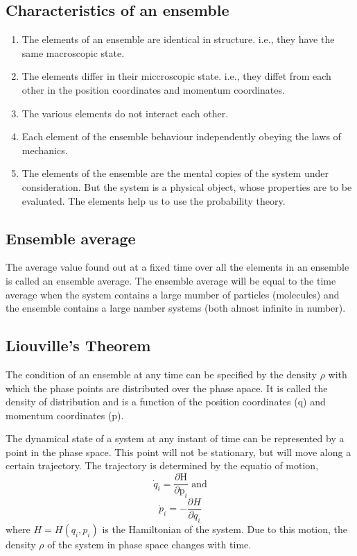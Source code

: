 \subsection{Characteristics of an ensemble}
\begin{enumerate}
	\item  The elements of an ensemble are identical in structure. i.e., they have the same macroscopic state.
\item  The elements differ in their miccroscopic state. i.e., they diffet from each other in the position coordinates and momentum coordinates.
\item  The various elements do not interact each other.
\item  Each element of the ensemble behaviour independently obeying the laws of mechanics.
\item  The elements of the ensemble are the mental copies of the system under consideration. But the system is a physical object, whose properties are to be evaluated. The elements help us to use the probability theory.
\end{enumerate}
\subsection{Ensemble average}
The average value found out at a fixed time over all the elements in an ensemble is called an ensemble average. The ensemble average will be equal to the time average when the system contains a large mumber of particles (molecules) and the ensemble contains a large namber systems (both almost infinite in number).
\subsection{Liouville's Theorem}
The condition of an ensemble at any time can be specified by the density $\rho$ with which the phase points are distributed over the phase apace.  It is called the density of distribution and is a function of the position coordinates (q) and momentum coordinates (p).

The dynamical state of a system at any instant of time can be represented by a point in the phase space.  This point will not be stationary, but will move along a certain trajectory. The trajectory is determined by the equatio of motion,
$$\dot{q}_{i}=\frac{\partial \mathrm{H}}{\partial \mathrm{p}_{i}}\text{ and}$$
$$\dot{p}_{i}=-\frac{\partial H}{\partial \dot{q}_{i}}$$
where $H=H\left(q_{i}, p_{i}\right)$ is the Hamiltonian of the system. Due to this motion, the density $\rho$ of the system in phase space changes with time.

